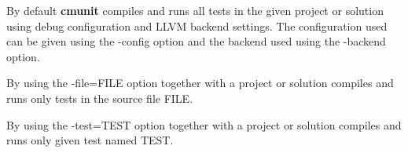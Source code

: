 \documentclass[oneside, a4paper, 11pt]{article}
\begin{document}
By default \textbf{cmunit} compiles and runs all tests in the given project or solution
using debug configuration and LLVM backend settings.
The configuration used can be given using the -config option and the backend used
using the -backend option.

By using the -file=FILE option together with a project or solution compiles and
runs only tests in the source file FILE.

By using the -test=TEST option together with a project or solution compiles and
runs only given test named TEST.
\end{document}
